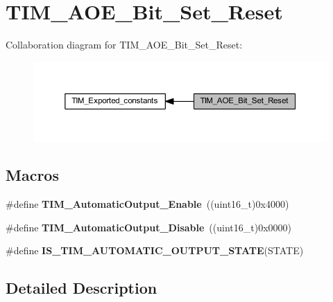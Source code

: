 \hypertarget{group___t_i_m___a_o_e___bit___set___reset}{}\section{T\+I\+M\+\_\+\+A\+O\+E\+\_\+\+Bit\+\_\+\+Set\+\_\+\+Reset}
\label{group___t_i_m___a_o_e___bit___set___reset}
Collaboration diagram for T\+I\+M\+\_\+\+A\+O\+E\+\_\+\+Bit\+\_\+\+Set\+\_\+\+Reset\+:
\nopagebreak
\begin{figure}[H]
\begin{center}
\leavevmode
\includegraphics[width=350pt]{group___t_i_m___a_o_e___bit___set___reset}
\end{center}
\end{figure}
\subsection*{Macros}
\begin{DoxyCompactItemize}
\item 
\mbox{\label{group___t_i_m___a_o_e___bit___set___reset_gaa416873d01fe62fe8d3f9c8bb7853fa1}} 
\#define {\bfseries T\+I\+M\+\_\+\+Automatic\+Output\+\_\+\+Enable}~((uint16\+\_\+t)0x4000)
\item 
\mbox{\label{group___t_i_m___a_o_e___bit___set___reset_ga0f80ba4fbadd434bc82ca63e904ace41}} 
\#define {\bfseries T\+I\+M\+\_\+\+Automatic\+Output\+\_\+\+Disable}~((uint16\+\_\+t)0x0000)
\item 
\#define {\bfseries I\+S\+\_\+\+T\+I\+M\+\_\+\+A\+U\+T\+O\+M\+A\+T\+I\+C\+\_\+\+O\+U\+T\+P\+U\+T\+\_\+\+S\+T\+A\+TE}(S\+T\+A\+TE)
\end{DoxyCompactItemize}


\subsection{Detailed Description}


